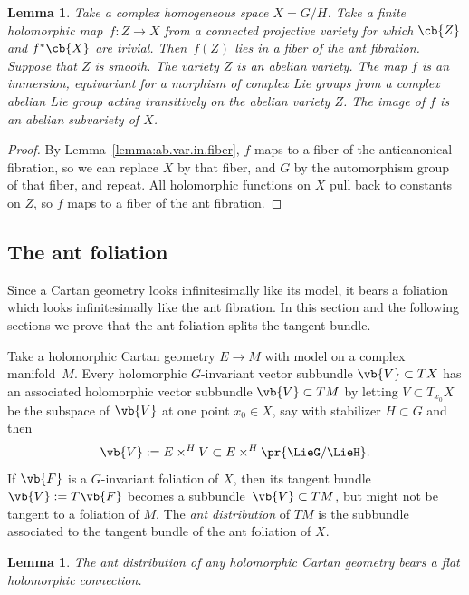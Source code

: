 \documentclass[10pt,a4paper]{amsart}
\numberwithin{equation}{section}
\newtheorem{Lemma}[Theorem]{Lemma}
\begin{document}
\begin{Lemma}\label{lemma:ab.var.in.fiber.2}
Take a complex homogeneous space $X = G/H$.
Take a finite holomorphic map~${f \colon Z \to X}$ from a connected projective variety for which $\cb{Z}$ and $f^*\cb{X}$ are trivial.
Then~$f(Z)$ lies in a fiber of the ant fibration.
Suppose that $Z$ is smooth.
The variety $Z$ is an abelian variety.
The map $f$ is an immersion, equivariant for a morphism of complex Lie groups from a complex abelian Lie group acting transitively on the abelian variety $Z$.
The image of $f$ is an abelian subvariety of $X$.
\end{Lemma}

\begin{proof}
By Lemma~\ref{lemma:ab.var.in.fiber}, $f$ maps to a fiber of the anticanonical fibration, so we can replace $X$ by that fiber, and $G$ by the automorphism group of that fiber, and repeat.
All holomorphic functions on $X$ pull back to constants on $Z$, so $f$ maps to a fiber of the ant fibration.
\end{proof}

\subsection{The ant foliation}
Since a Cartan geometry looks infinitesimally like its model, it bears a foliation which looks infinitesimally like the ant fibration.
In this section and the following sections we prove that the ant foliation splits the tangent bundle.

Take a holomorphic Cartan geometry $E \to M$ with model  on a complex manifold~$M$.
Every holomorphic $G$-invariant vector subbundle $\vb{V} \subset TX$ has an associated
holomorphic vector subbundle $\vb{V} \subset TM$ by letting $V \subset T_{x_0} X$ be the
subspace of $\vb{V}$ at one point $x_0 \in X$, say with stabilizer $H \subset G$ and then
\[
\vb{V} := E \times^H V \subset E \times^H \pr{\LieG/\LieH}.
\]
If $\vb{F}$ is a $G$-invariant foliation of $X$, then its tangent bundle $\vb{V} := T\vb{F}$
becomes a subbundle~${\vb{V} \subset TM}$, but might not be tangent to a foliation of $M$.
The \emph{ant distribution} of $TM$ is the subbundle associated to the tangent bundle of the ant
foliation of $X$.

\begin{Lemma}
The ant distribution of any holomorphic Cartan geometry bears a flat holomorphic connection.
\end{Lemma}
\end{document}

